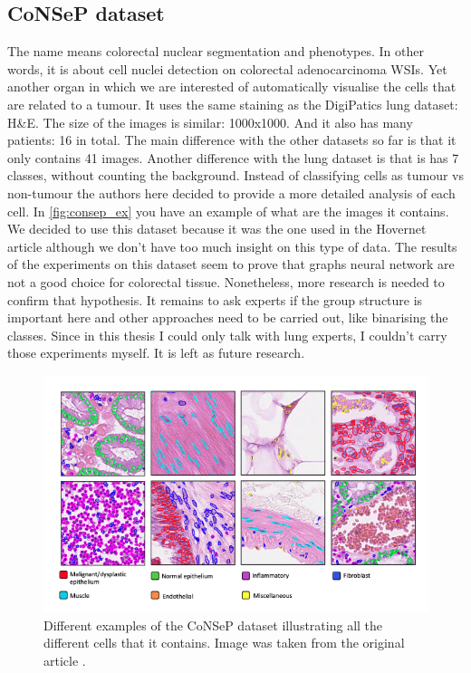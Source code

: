\subsection{CoNSeP dataset}\label{sec:data_consep}

The name means colorectal nuclear segmentation and phenotypes. In other words, it is about cell nuclei detection on colorectal adenocarcinoma WSIs. Yet another organ in which we are interested of automatically visualise the cells that are related to a tumour. It uses the same staining as the DigiPatics lung dataset: H\&E. The size of the images is similar: 1000x1000. And it also has many patients: 16 in total. The main difference with the other datasets so far is that it only contains 41 images. Another difference with the lung dataset is that is has 7 classes, without counting the background. Instead of classifying cells as tumour vs non-tumour the authors here decided to provide a more detailed analysis of each cell. In \autoref{fig:consep_ex} you have an example of what are the images it contains. We decided to use this dataset because it was the one used in the Hovernet article although we don't have too much insight on this type of data. The results of the experiments on this dataset seem to prove that graphs neural network are not a good choice for colorectal tissue. Nonetheless, more research is needed to confirm that hypothesis. It remains to ask experts if the group structure is important here and other approaches need to be carried out, like binarising the classes. Since in this thesis I could only talk with lung experts, I couldn't carry those experiments myself. It is left as future research.

\begin{figure}[H]
    \centering
    \includegraphics[width=\textwidth]{imgs/data/consep.png}
    \caption{Different examples of the CoNSeP dataset illustrating all the different cells that it contains. Image was taken from the original article \cite{hovernet}.}
    \label{fig:consep_ex}
\end{figure}

